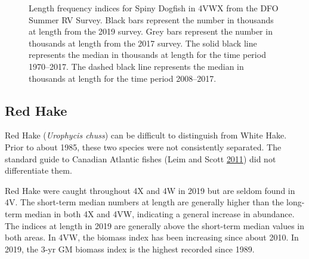 \documentclass[11pt]{book}
\begin{document}
\begin{figure}[htb]

{\centering {} 

}

\caption{Length frequency indices for Spiny Dogfish in 4VWX from the DFO Summer RV Survey. Black bars represent the number in thousands at length from the 2019 survey. Grey bars represent the number in thousands at length from the 2017 survey. The solid black line represents the median in thousands at length for the time period 1970--2017. The dashed black line represents the median in thousands at length for the time period 2008--2017.}\label{fig:107-fig-dogfish-lengthfreq}
\end{figure}
\clearpage

\hypertarget{red-hake}{%
\subsection{Red Hake}\label{red-hake}}

Red Hake (\emph{Urophycis chuss}) can be difficult to distinguish from White Hake. Prior to about 1985, these two species were not consistently separated. The standard guide to Canadian Atlantic fishes (Leim and Scott \protect\hyperlink{ref-LeimScott1966}{2011}) did not differentiate them.

Red Hake were caught throughout 4X and 4W in 2019 but are seldom found in 4V. The short-term median numbers at length are generally higher than the long-term median in both 4X and 4VW, indicating a general increase in abundance. The indices at length in 2019 are generally above the short-term median values in both areas. In 4VW, the biomass index has been increasing since about 2010. In 2019, the 3-yr GM biomass index is the highest recorded since 1989.
\end{document}
